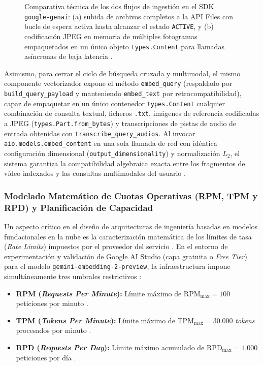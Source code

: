 \begin{figure}[htbp]
\caption{Comparativa técnica de los dos flujos de ingestión en el SDK \texttt{google-genai}: (a) subida de archivos completos a la API Files con bucle de espera activa hasta alcanzar el estado \texttt{ACTIVE}, y (b) codificación JPEG en memoria de múltiples fotogramas empaquetados en un único objeto \texttt{types.Content} para llamadas asíncronas de baja latencia \cite{gemini_emb2_docs}.} %
\label{fig:gemini_ingest_modes}
\end{figure}

Asimismo, para cerrar el ciclo de búsqueda cruzada y multimodal, el mismo componente vectorizador expone el método \texttt{embed\_query} (respaldado por \texttt{build\_query\_payload} y manteniendo \texttt{embed\_text} por retrocompatibilidad), capaz de empaquetar en un único contenedor \texttt{types.Content} cualquier combinación de consulta textual, ficheros \texttt{.txt}, imágenes de referencia codificadas a JPEG (\texttt{types.Part.from\_bytes}) y transcripciones de pistas de audio de entrada obtenidas con \texttt{transcribe\_query\_audios}. Al invocar \texttt{aio.models.embed\_content} en una sola llamada de red con idéntica configuración dimensional (\texttt{output\_dimensionality}) y normalización $L_2$, el sistema garantiza la compatibilidad algebraica exacta entre los fragmentos de vídeo indexados y las consultas multimodales del usuario \cite{gemini_emb2_docs}. %

\subsubsection{Modelado Matemático de Cuotas Operativas (RPM, TPM y RPD) y Planificación de Capacidad}
\label{subsubsec:modelado_cuotas_capacidad}

Un aspecto crítico en el diseño de arquitecturas de ingeniería basadas en modelos fundacionales en la nube es la caracterización matemática de los límites de tasa (\textit{Rate Limits}) impuestos por el proveedor del servicio \cite{gemini_emb2_docs}. %
En el entorno de experimentación y validación de Google AI Studio (capa gratuita o \textit{Free Tier}) para el modelo \texttt{gemini-embedding-2-preview}, la infraestructura impone simultáneamente tres umbrales restrictivos \cite{gemini_emb2_docs}: %
\begin{itemize}
    \item \textbf{RPM (\textit{Requests Per Minute}):} Límite máximo de $\text{RPM}_{\max} = 100$ peticiones por minuto \cite{gemini_emb2_docs}. %
    \item \textbf{TPM (\textit{Tokens Per Minute}):} Límite máximo de $\text{TPM}_{\max} = 30.000$ \textit{tokens} procesados por minuto \cite{gemini_emb2_docs}. %
    \item \textbf{RPD (\textit{Requests Per Day}):} Límite máximo acumulado de $\text{RPD}_{\max} = 1.000$ peticiones por día \cite{gemini_emb2_docs}. %
\end{itemize}

